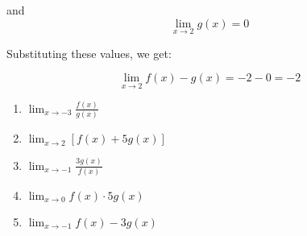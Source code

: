 and 
$$\lim_{x\to2}g(x) = 0$$

Substituting these values, we get:

$$\lim_{x\to2}f(x) - g(x) = -2 - 0 = -2$$

\begin{Exercise}
    [title = Limits Practice 6, label=limits6]
\begin{enumerate}
    \item $\lim_{x\to-3} \frac{f(x)}{g(x)}$
    \item $\lim_{x\to2}\left[f(x) + 5g(x)\right]$
    \item $\lim_{x\to-1} \frac{3g(x)}{f(x)}$
    \item $\lim_{x\to0}f(x) \cdot 5g(x)$
    \item $\lim_{x\to-1} f(x) - 3g(x) $
\end{enumerate}
\vspace{40mm}
\end{Exercise}
